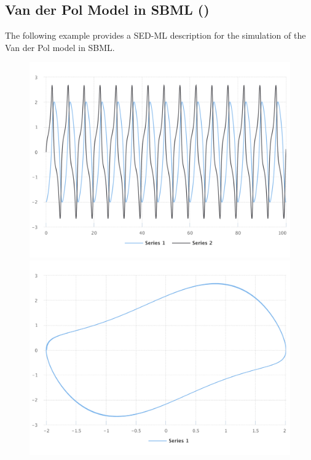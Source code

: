 \subsection{Van der Pol Model in SBML ()}
\label{example:vanderpol_sbml}
The following example provides a SED-ML description for the simulation of the Van der Pol model in SBML.

\begin{figure}[ht]
    \centering
    \begin{minipage}{0.47\textwidth}
        \centering
        \includegraphics[width=1.0\textwidth]{examples/vanderpol-sbml/results/sedml_webtools/plot1}
        \includegraphics[width=1.0\textwidth]{examples/vanderpol-sbml/results/sedml_webtools/plot2}

\end{minipage}
\end{figure}
